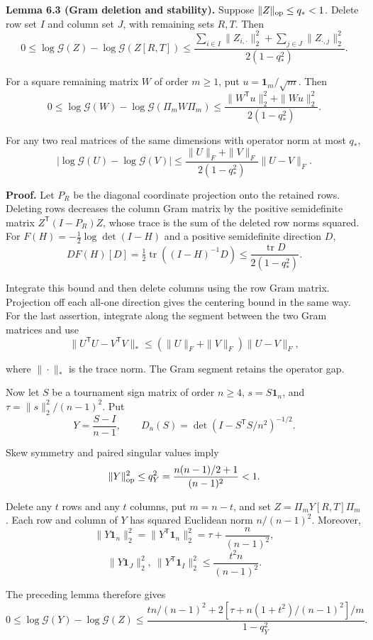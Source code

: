 \documentclass[11pt,a4paper]{article}
\makeatletter
\newcommand{\paperstatement}[3]{\par\addvspace{6pt}\Needspace{4\baselineskip}\phantomsection\def\@currentlabel{#2}\label{#3}\noindent\textbf{#1}\enspace}
\makeatother
\begin{document}
\paperstatement{Lemma 6.3 (Gram deletion and stability).}{6.3}{thm-6.3} Suppose \(\|Z\|_{\rm op}\le q_*<1\). Delete row set \(I\) and column set \(J\), with remaining sets \(R,T\). Then
\[0\le\log\mathcal G(Z)-\log\mathcal G(Z[R,T])\le\frac{\sum_{i\in I}\|Z_{i,\cdot}\|_2^2+\sum_{j\in J}\|Z_{\cdot,j}\|_2^2}{2(1-q_*^2)}.\]

For a square remaining matrix \(W\) of order \(m\ge1\), put \(u=\mathbf 1_m/\sqrt m\). Then
\[0\le\log\mathcal G(W)-\log\mathcal G(\Pi_mW\Pi_m)\le\frac{\|W^{\mathsf T}u\|_2^2+\|Wu\|_2^2}{2(1-q_*^2)}.\]

For any two real matrices of the same dimensions with operator norm at most \(q_*\),
\[|\log\mathcal G(U)-\log\mathcal G(V)|\le\frac{\|U\|_F+\|V\|_F}{2(1-q_*^2)}\|U-V\|_F.\]

\textbf{Proof.} Let \(P_R\) be the diagonal coordinate projection onto the retained rows. Deleting rows decreases the column Gram matrix by the positive semidefinite matrix \(Z^{\mathsf T}(I-P_R)Z\), whose trace is the sum of the deleted row norms squared. For \(F(H)=-\tfrac12\log\det(I-H)\) and a positive semidefinite direction \(D\),
\[DF(H)[D]=\tfrac12\operatorname{tr}((I-H)^{-1}D)\le\frac{\operatorname{tr}D}{2(1-q_*^2)}.\]

Integrate this bound and then delete columns using the row Gram matrix. Projection off each all-one direction gives the centering bound in the same way. For the last assertion, integrate along the segment between the two Gram matrices and use
\[\|U^{\mathsf T}U-V^{\mathsf T}V\|_*\le(\|U\|_F+\|V\|_F)\|U-V\|_F,\]

where \(\|\cdot\|_*\) is the trace norm. The Gram segment retains the operator gap.

Now let \(S\) be a tournament sign matrix of order \(n\ge4\), \(s=S\mathbf 1_n\), and \(\tau=\|s\|_2^2/(n-1)^2\). Put
\[Y=\frac{S-I}{n-1},\qquad D_n(S)=\det(I-S^{\mathsf T}S/n^2)^{-1/2}.\]

Skew symmetry and paired singular values imply
\[\|Y\|_{\rm op}^2\le q_Y^2=\frac{n(n-1)/2+1}{(n-1)^2}<1.\]

Delete any \(t\) rows and any \(t\) columns, put \(m=n-t\), and set \(Z=\Pi_mY[R,T]\Pi_m\). Each row and column of \(Y\) has squared Euclidean norm \(n/(n-1)^2\). Moreover,
\[\|Y\mathbf 1_n\|_2^2=\|Y^{\mathsf T}\mathbf 1_n\|_2^2=\tau+\frac n{(n-1)^2},\]
\nopagebreak[3]\[\|Y\mathbf 1_J\|_2^2,\ \|Y^{\mathsf T}\mathbf 1_I\|_2^2\le\frac{t^2n}{(n-1)^2}.\]

The preceding lemma therefore gives
\[0\le\log\mathcal G(Y)-\log\mathcal G(Z)\le\frac{t n/(n-1)^2+2[\tau+n(1+t^2)/(n-1)^2]/m}{1-q_Y^2}.\]
\end{document}
